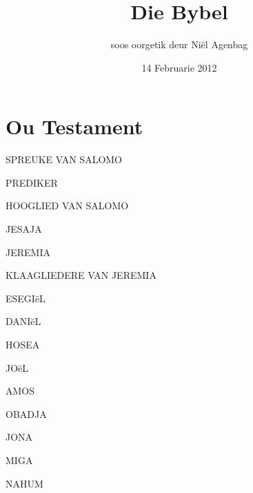 \documentclass[twoside,twocolumn,letterpaper]{book}
\newcommand{\jnumChapters}{0}
\begin{document}
\frontmatter

\title{Die Bybel}
\date{14 Februarie 2012}
\author{soos oorgetik deur Ni\"el Agenbag}
\setlength{\columnseprule}{0pt}
\maketitle

\mainmatter

\part*{Ou Testament}
\setlength{\columnseprule}{0.0pt}
\renewcommand{\jnumChapters}{0}









































SPREUKE VAN SALOMO

PREDIKER

HOOGLIED VAN SALOMO

JESAJA

JEREMIA

KLAAGLIEDERE VAN JEREMIA

ESEGIëL

DANIëL

HOSEA

JOëL

AMOS

OBADJA

JONA

MIGA

NAHUM
\end{document}
